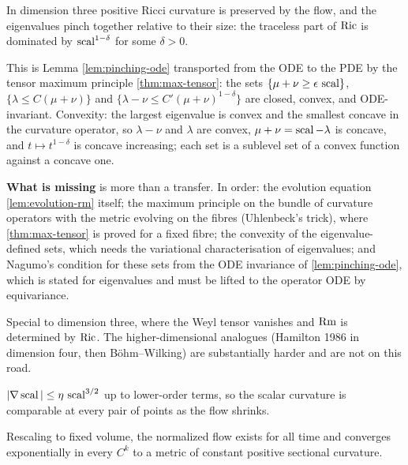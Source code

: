 \begin{lemma}
  \label{lem:pinching}
  In dimension three positive Ricci curvature is preserved by the flow, and
  the eigenvalues pinch together relative to their size: the traceless part
  of $\operatorname{Ric}$ is dominated by $\operatorname{scal}^{1-\delta}$ for some $\delta > 0$.

  This is Lemma \ref{lem:pinching-ode} transported from the ODE to the PDE by
  the tensor maximum principle \ref{thm:max-tensor}: the sets
  $\{\mu+\nu \ge \epsilon\,\operatorname{scal}\}$, $\{\lambda \le C(\mu+\nu)\}$ and
  $\{\lambda-\nu \le C'(\mu+\nu)^{1-\delta}\}$ are closed, convex, and
  ODE-invariant. Convexity: the largest eigenvalue is convex and the smallest
  concave in the curvature operator, so $\lambda - \nu$ and $\lambda$ are
  convex, $\mu + \nu = \operatorname{scal} - \lambda$ is concave, and $t \mapsto
  t^{1-\delta}$ is concave increasing; each set is a sublevel set of a convex
  function against a concave one.

  \textbf{What is missing} is more than a transfer. In order: the evolution
  equation \ref{lem:evolution-rm} itself; the maximum principle on the bundle
  of curvature operators with the metric evolving on the fibres (Uhlenbeck's
  trick), where \ref{thm:max-tensor} is proved for a fixed fibre; the
  convexity of the eigenvalue-defined sets, which needs the variational
  characterisation of eigenvalues; and Nagumo's condition for these sets from
  the ODE invariance of \ref{lem:pinching-ode}, which is stated for
  eigenvalues and must be lifted to the operator ODE by equivariance.

  Special to dimension three, where the Weyl tensor vanishes and $\operatorname{Rm}$ is
  determined by $\operatorname{Ric}$. The higher-dimensional analogues (Hamilton 1986 in
  dimension four, then B\"ohm--Wilking) are substantially harder and are not on
  this road.
\end{lemma}

\begin{lemma}
  \label{lem:gradient-scal}
  $|\nabla \operatorname{scal}| \le \eta\, \operatorname{scal}^{3/2}$ up to lower-order terms, so the scalar
  curvature is comparable at every pair of points as the flow shrinks.
\end{lemma}

\begin{theorem}
  \label{thm:normalized-convergence}
  Rescaling to fixed volume, the normalized flow exists for all time and
  converges exponentially in every $C^k$ to a metric of constant positive
  sectional curvature.
\end{theorem}

